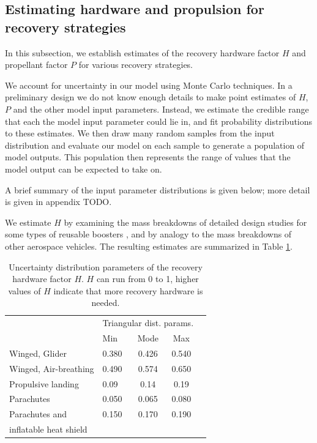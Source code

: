 \documentclass[conf]{new-aiaa}
\begin{document}
\begin{multicols}{2}
\subsection{Estimating hardware and propulsion for recovery strategies}
In this subsection, we establish estimates of the recovery hardware factor $H$ and propellant factor $P$ for various recovery strategies.

We account for uncertainty in our model using Monte Carlo techniques. In a preliminary design we do not know enough details to make point estimates of $H$, $P$ and the other model input parameters. Instead, we estimate the credible range that each the model input parameter could lie in, and fit probability distributions to these estimates. We then draw many random samples from the input distribution and evaluate our model on each sample to generate a population of model outputs. This population then represents the range of values that the model output can be expected to take on.

A brief summary of the input parameter distributions is given below; more detail is given in appendix TODO.

We estimate $H$ by examining the mass breakdowns of detailed design studies for some types of reusable boosters \cite{Healy1998, Isakowitz2004, Sippel2003, Hellman2005}, and by analogy to the mass breakdowns of other aerospace vehicles. The resulting estimates are summarized in Table \ref{tab:hardware_factor_distributions}.


\begin{table}[H]
    \centering
    \caption{\label{tab:hardware_factor_distributions} Uncertainty distribution parameters of the recovery hardware factor $H$. $H$ can run from 0 to 1, higher values of $H$ indicate that more recovery hardware is needed.}
    \begin{tabular}{l l c c c}
    \hline
     & \multicolumn{3}{c}{Triangular dist. params.} \\
     & Min & Mode & Max \\
    \hline
    \hline
    Winged, Glider  & 0.380 & 0.426 & 0.540 \\
    Winged, Air-breathing & 0.490 & 0.574 & 0.650 \\
    \hline
    Propulsive landing  & 0.09 & 0.14 & 0.19 \\
    \hline
    Parachutes & 0.050 & 0.065 & 0.080 \\
    Parachutes and & 0.150 & 0.170 & 0.190 \\
    inflatable heat shield & & & \\
    \hline
    \end{tabular}
\end{table}


\end{multicols}
\end{document}
